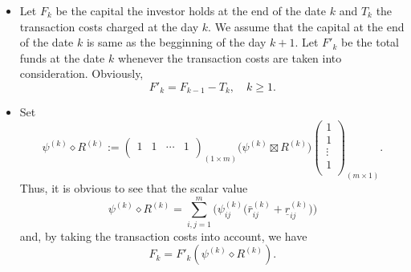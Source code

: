 \documentclass[11pt]{article}
\numberwithin{equation}{section}
\begin{document}
\begin{itemize}
	
	\item Let $F_k$ be the capital the investor holds at the end of the date $k$ and $T_k$ the transaction costs charged at the day $k$. We assume that the capital at the end of the  date $k$ is same as the begginning of the day $k+1$. Let  $F'_k$ be  the total funds at the date $k$ whenever the transaction costs are taken into consideration.  Obviously, 
	\begin{equation}\label{Bulage}
	F'_k=F_{k-1}-T_k,  \quad k\geqslant 1.\end{equation}
\item Set
\begin{equation*}
\psi^{(k)}\diamond R^{(k)}:=\left(\begin{array}{ccccc}
	1 & 1&\cdots&1\\

	\end{array}
	\right)_{(1\times m)}\Big(\psi^{(k)}\boxtimes R^{(k)}\Big)\left(\begin{array}{c}
	
	1\\
	1\\
	\vdots\\
	1\\
	\end{array}
	\right)_{(m\times 1)}.
\end{equation*}
Thus, it is obvious to see that the scalar value 
\begin{equation}\label{Qingmai}
\psi^{(k)}\diamond R^{(k)}=\sum_{i,j=1}^{m}\Big( \psi_{ij}^{(k)}\Big(\bar r^{(k)}_{ij}+\underline r^{(k)}_{ij}\Big)\Big)
\end{equation}
and, by taking the transaction costs into account, we have 
\begin{equation}\label{Fishman}
F_k=F'_k( \psi^{(k)}\diamond R^{(k)}).
\end{equation}
\end{itemize}
\end{document}
